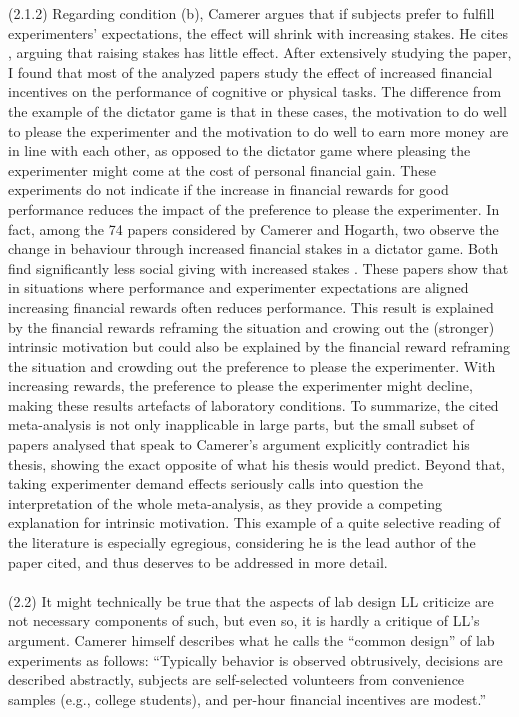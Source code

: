 \documentclass{article}
\begin{document}
(2.1.2) Regarding condition (b), Camerer argues that if subjects prefer to fulfill experimenters' expectations, the effect will shrink with increasing stakes. He cites \citet{Camerer.1999c}, arguing that raising stakes has little effect. After extensively studying the paper, I found that most of the analyzed papers study the effect of increased financial incentives on the performance of cognitive or physical tasks. The difference from the example of the dictator game is that in these cases, the motivation to do well to please the experimenter and the motivation to do well to earn more money are in line with each other, as opposed to the dictator game where pleasing the experimenter might come at the cost of personal financial gain. These experiments do not indicate if the increase in financial rewards for good performance reduces the impact of the preference to please the experimenter. In fact, among the 74 papers considered by Camerer and Hogarth, two observe the change in behaviour through increased financial stakes in a dictator game. Both find significantly less social giving with increased stakes \citep{Forsythe.1994,Sefton.1992}. These papers show that in situations where performance and experimenter expectations are aligned increasing financial rewards often reduces performance. This result is explained by the financial rewards reframing the situation and crowing out the (stronger) intrinsic motivation but could also be explained by the financial reward reframing the situation and crowding out the preference to please the experimenter. With increasing rewards, the preference to please the experimenter might decline, making these results artefacts of laboratory conditions. 
To summarize, the cited meta-analysis is not only inapplicable in large parts, but the small subset of papers analysed that speak to Camerer's argument explicitly contradict his thesis, showing the exact opposite of what his thesis would predict. Beyond that, taking experimenter demand effects seriously calls into question the interpretation of the whole meta-analysis, as they provide a competing explanation for intrinsic motivation. 
This example of a quite selective reading of the literature is especially egregious, considering he is the lead author of the paper cited, and thus deserves to be addressed in more detail. 
\\
\\
(2.2) It might technically be true that the aspects of lab design LL criticize are not necessary components of such, but even so, it is hardly a critique of LL's argument. Camerer himself describes what he calls the “common design” of lab experiments as follows: “Typically behavior is observed obtrusively, decisions are described abstractly, subjects are self-selected volunteers from convenience samples (e.g., college students), and per-hour financial incentives are modest.”
\end{document}
